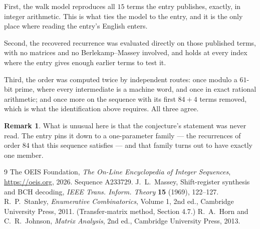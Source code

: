 \documentclass[11pt,a4paper]{article}
\theoremstyle{plain}
\theoremstyle{definition}
\newtheorem{remark}[theorem]{Remark}
\begin{document}
First, the walk model reproduces all $15$ terms the entry publishes, exactly, in integer
arithmetic. This is what ties the model to the entry, and it is the only place where reading
the entry's English enters.

Second, the recovered recurrence was evaluated directly on those published terms, with no
matrices and no Berlekamp--Massey involved, and holds at every index where the entry gives
enough earlier terms to test it.

Third, the order was computed twice by independent routes: once modulo a $61$-bit prime, where
every intermediate is a machine word, and once in exact rational arithmetic; and once more on
the sequence with its first $84+4$ terms removed, which is what the identification above
requires. All three agree.

\begin{remark}
What is unusual here is that the conjecture's statement was never read. The entry pins it down
to a one-parameter family --- the recurrences of order $84$ that this sequence satisfies
--- and that family turns out to have exactly one member.
\end{remark}

\begin{thebibliography}{9}
 The OEIS Foundation, \emph{The On-Line Encyclopedia of Integer
Sequences}, \url{https://oeis.org}, 2026. Sequence A233729.
 J.~L.~Massey, Shift-register synthesis and BCH decoding, \emph{IEEE
Trans. Inform. Theory} \textbf{15} (1969), 122--127.
 R.~P.~Stanley, \emph{Enumerative Combinatorics}, Volume 1, 2nd ed.,
Cambridge University Press, 2011. (Transfer-matrix method, Section 4.7.)
 R.~A.~Horn and C.~R.~Johnson, \emph{Matrix Analysis}, 2nd ed., Cambridge
University Press, 2013.
\end{thebibliography}
\end{document}
